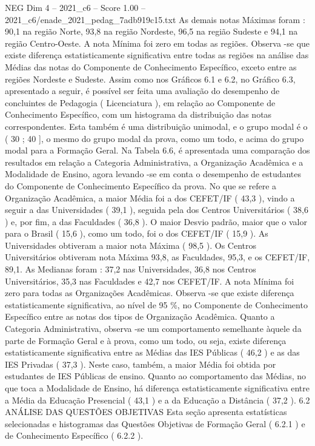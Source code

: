 \begin{textsample}{NEG Dim 4 – 2021\_c6 – Score 1.00 – 2021\_c6/enade\_2021\_pedag\_7adb919c15.txt}
As demais notas Máximas foram : 90,1 na região Norte, 93,8 na região Nordeste, 96,5 na região Sudeste e 94,1 na região Centro-Oeste.
A nota Mínima foi zero em todas as regiões.
Observa -se que existe diferença estatisticamente significativa entre todas as regiões na análise das Médias das notas do Componente de Conhecimento Específico, exceto entre as regiões Nordeste e Sudeste.
Assim como nos Gráficos 6.1 e 6.2, no Gráfico 6.3, apresentado a seguir, é possível ser feita uma avaliação do desempenho de concluintes de Pedagogia ( Licenciatura ), em relação ao Componente de Conhecimento Específico, com um histograma da distribuição das notas correspondentes.
Esta também é uma distribuição unimodal, e o grupo modal é o ( 30 ; 40 ], o mesmo do grupo modal da prova, como um todo, e acima do grupo modal para a Formação Geral.
Na Tabela 6.6, é apresentada uma comparação dos resultados em relação a Categoria Administrativa, a Organização Acadêmica e a Modalidade de Ensino, agora levando -se em conta o desempenho de estudantes do Componente de Conhecimento Específico da prova.
No que se refere a Organização Acadêmica, a maior Média foi a dos CEFET/IF ( 43,3 ), vindo a seguir a das Universidades ( 39,1 ), seguida pela dos Centros Universitários ( 38,6 ) e, por fim, a das Faculdades ( 36,8 ).
O maior Desvio padrão, maior que o valor para o Brasil ( 15,6 ), como um todo, foi o dos CEFET/IF ( 15,9 ).
As Universidades obtiveram a maior nota Máxima ( 98,5 ).
Os Centros Universitários obtiveram nota Máxima 93,8, as Faculdades, 95,3, e os CEFET/IF, 89,1.
As Medianas foram : 37,2 nas Universidades, 36,8 nos Centros Universitários, 35,3 nas Faculdades e 42,7 nos CEFET/IF.
A nota Mínima foi zero para todas as Organizações Acadêmicas.
Observa -se que existe diferença estatisticamente significativa, ao nível de 95 \%, no Componente de Conhecimento Específico entre as notas dos tipos de Organização Acadêmica.
Quanto a Categoria Administrativa, observa -se um comportamento semelhante àquele da parte de Formação Geral e à prova, como um todo, ou seja, existe diferença estatisticamente significativa entre as Médias das IES Públicas ( 46,2 ) e as das IES Privadas ( 37,3 ).
Neste caso, também, a maior Média foi obtida por estudantes de IES Públicas de ensino.
Quanto ao comportamento das Médias, no que toca a Modalidade de Ensino, há diferença estatisticamente significativa entre a Média da Educação Presencial ( 43,1 ) e a da Educação a Distância ( 37,2 ). 6.2 ANÁLISE DAS QUESTÕES OBJETIVAS Esta seção apresenta estatísticas selecionadas e histogramas das Questões Objetivas de Formação Geral ( 6.2.1 ) e de Conhecimento Específico ( 6.2.2 ).

\end{textsample}
